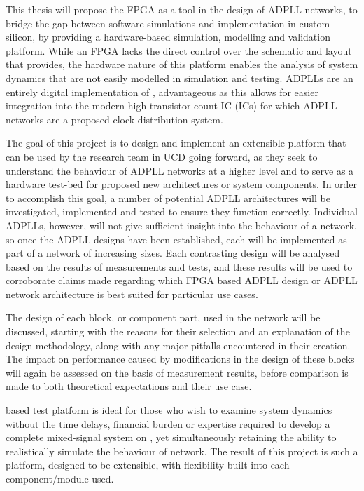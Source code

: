 This thesis will propose the \ac{FPGA} as a tool in the design of \ac{ADPLL} networks, to bridge the gap between software simulations and implementation in custom silicon, by providing a hardware-based simulation, modelling and validation platform. While an FPGA lacks the direct control over the schematic and layout that  provides, the hardware nature of this platform enables the analysis of system dynamics that are not easily modelled in simulation and testing. \acp{ADPLL} are an entirely digital implementation of , advantageous as this allows for easier integration into the modern high transistor count \acl{IC} (\acs{IC}s) for which \ac{ADPLL} networks are a proposed clock distribution system.

The goal of this project is to design and implement an extensible platform that can be used by the research team in \ac{UCD} going forward, as they seek to understand the behaviour of \ac{ADPLL} networks at a higher level and to serve as a hardware test-bed for proposed new architectures or system components. In order to accomplish this goal, a number of potential \ac{ADPLL} architectures will be investigated, implemented and tested to ensure they function correctly. Individual \acsp{ADPLL}, however, will not give sufficient insight into the behaviour of a network, so once the \ac{ADPLL} designs have been established, each will be implemented as part of a network of increasing sizes. Each contrasting design will be analysed based on the results of measurements and tests, and these results will be used to corroborate claims made regarding which \ac{FPGA} based \ac{ADPLL} design or \ac{ADPLL} network architecture is best suited for particular use cases.

The design of each block, or component part, used in the network will be discussed, starting with the reasons for their selection and an explanation of the design methodology, along with any major pitfalls encountered in their creation. The impact on performance caused by modifications in the design of these blocks will again be assessed on the basis of measurement results, before comparison is made to both theoretical expectations and their use case.

 based test platform is ideal for those who wish to examine system dynamics without the time delays, financial burden or expertise required to develop a complete mixed-signal system on , yet simultaneously retaining the ability to realistically simulate the behaviour of  network. The result of this project is such a platform, designed to be extensible, with flexibility built into each component/module used.